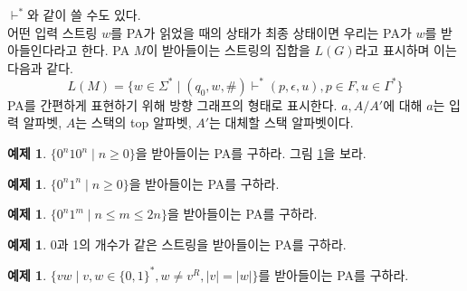 \documentclass[b5paper, 10pt]{book}
\theoremstyle{definition}
\newtheorem{ex}[defn]{예제}
\begin{document}
$\vdash^*$와 같이 쓸 수도 있다. \\ 
어떤 입력 스트링 $w$를 PA가 읽었을 때의 상태가 최종 상태이면 우리는 PA가 $w$를 받아들인다라고 한다.
PA $M$이 받아들이는 스트링의 집합을 $L(G)$라고 표시하며 이는 다음과 같다.
$$L(M) = \{w \in \Sigma^* \;\vert\; (q_0, w, \text{\#}) \vdash^* 
(p, \epsilon, u), p\in F, u \in \Gamma^*\}$$
PA를 간편하게 표현하기 위해 방향 그래프의 형태로 표시한다. $a, A/A'$에 대해 $a$는 입력 알파벳,
$A$는 스택의 top 알파벳, $A'$는 대체할 스택 알파벳이다. 
\begin{ex} \label{0n10n_ex}
    $\{0^n10^{n} \;\vert\; n \ge 0 \}$을 받아들이는 PA를 구하라. 그림 \ref{0n10n}을 보라.
\end{ex}
\begin{figure}[!ht]
    \centering
    \caption{} 
    \label{0n10n}
\end{figure}
\begin{ex}
    $\{0^n1^{n} \;\vert\; n \ge 0 \}$을 받아들이는 PA를 구하라.
\end{ex}
\begin{ex}
    $\{0^n1^{m} \;\vert\; n \le m \le 2n \}$을 받아들이는 PA를 구하라.
\end{ex}
\begin{ex}
    0과 1의 개수가 같은 스트링을 받아들이는 PA를 구하라. 
\end{ex}
\begin{ex}
    $\{ vw \;\vert\; v,w \in \{0,1\}^*, w \neq v^R , \vert v \vert = \vert w \vert \}$를 
    받아들이는 PA를 구하라.
\end{ex}
\end{document}
